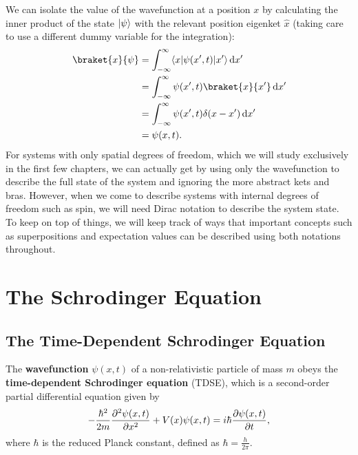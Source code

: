 \documentclass[../quantum_mechanics.tex]{subfiles}
\begin{document}
            We can isolate the value of the wavefunction at a position $x$ by calculating the inner product of the state $\lvert\psi\rangle$ with the relevant position eigenket $\hat{x}$ (taking care to use a different dummy variable for the integration):
            \begin{align}
                \braket{x}{\psi}&=\int_{-\infty}^\infty\bra{x}\psi(x^\prime,t)\ket{x^\prime}\dd{x^\prime}\\
                &=\int_{-\infty}^\infty\psi(x^\prime,t)\braket{x}{x^\prime}\dd{x^\prime}\\
                &=\int_{-\infty}^\infty\psi(x^\prime,t)\delta(x-x^\prime)\dd{x^\prime}\\
                &=\psi(x,t).
            \end{align}
            For systems with only spatial degrees of freedom, which we will study exclusively in the first few chapters, we can actually get by using only the wavefunction to describe the full state of the system and ignoring the more abstract kets and bras.
            However, when we come to describe systems with internal degrees of freedom such as spin, we will need Dirac notation to describe the system state.
            To keep on top of things, we will keep track of ways that important concepts such as superpositions and expectation values can be described using both notations throughout.
    

    \section{The Schrodinger Equation}\label{sec:the-schrodinger-equation}
        
        \subsection{The Time-Dependent Schrodinger Equation}\label{subsec:the-time-dependent-schrodinger-equation}
            The \textbf{wavefunction} $\psi(x,t)$ of a non-relativistic particle of mass $m$ obeys the \textbf{time-dependent Schrodinger equation} (TDSE), which is a second-order partial differential equation given by
            \begin{equation}\label{eq:tdse}
                -\frac{\hbar^2}{2m}\pdv[2]{\psi(x,t)}{x}+V(x)\psi(x,t)=i\hbar\pdv{\psi(x,t)}{t},
            \end{equation}
            where $\hbar$ is the reduced Planck constant, defined as $\hbar=\frac{h}{2\pi}$.
\end{document}
